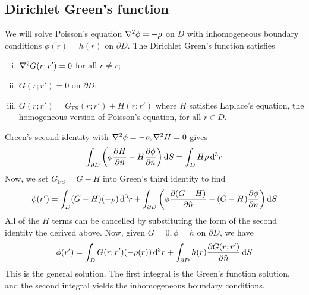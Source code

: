 \subsection{Dirichlet Green's function}
We will solve Poisson's equation \( \laplacian{\phi} = -\rho \) on \( D \) with inhomogeneous boundary conditions \( \phi(r) = h(r) \) on \( \partial D \).
The Dirichlet Green's function satisfies
\begin{enumerate}[(i)]
	\item \( \laplacian{G(r;r')} = 0 \) for all \( r \neq r \);
	\item \( G(r;r') = 0 \) on \( \partial D \);
	\item \( G(r;r') = G_{\mathrm{FS}}(r;r') + H(r;r') \) where \( H \) satisfies Laplace's equation, the homogeneous version of Poisson's equation, for all \( r \in D \).
\end{enumerate}
Green's second identity with \( \laplacian{\phi} = -\rho, \laplacian{H} = 0 \) gives
\[
	\int_{\partial D} \qty(\phi \pdv{H}{\hat n} - H \pdv{\phi}{\hat n}) \dd{S} = \int_D H \rho \dd[3]{r}
\]
Now, we set \( G_{\mathrm{FS}} = G - H \) into Green's third identity to find
\[
	\phi(r') = \int_D (G - H)(-\rho) \dd[3]{r} + \int_{\partial D} \qty(\phi \pdv{(G - H)}{\hat n} - (G-H) \pdv{\phi}{n}) \dd{S}
\]
All of the \( H \) terms can be cancelled by substituting the form of the second identity the derived above.
Now, given \( G = 0, \phi = h \) on \( \partial D \), we have
\[
	\phi(r') = \int_D G(r;r')(-\rho(r)) \dd[3]{r} + \int_{\partial D} h(r) \pdv{G(r;r')}{\hat n} \dd{S}
\]
This is the general solution.
The first integral is the Green's function solution, and the second integral yields the inhomogeneous boundary conditions.


